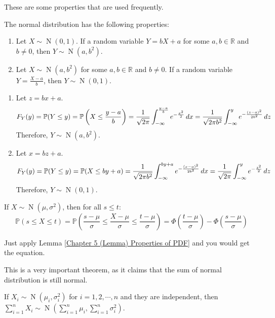 \documentclass{huhtakm-template-book}
\newcommand{\prob}{\mathbb{P}}
\DeclareMathOperator{\N}{N}
\begin{document}
These are some properties that are used frequently.
\begin{lem}
	\label{Chapter 5 (Lemma) Properties of Normal distribution}
	The normal distribution has the following properties:
	\begin{enumerate}
		\item Let $X\sim\N(0,1)$. If a random variable $Y=bX+a$ for some $a,b\in\mathbb{R}$ and $b\neq 0$, then $Y\sim\N(a,b^{2})$.
		\item Let $X\sim\N(a,b^{2})$ for some $a,b\in\mathbb{R}$ and $b\neq 0$. If a random variable $Y=\frac{X-a}{b}$, then $Y\sim\N(0,1)$.
	\end{enumerate}
\end{lem}
\begin{proofing}
	\begin{enumerate}
		\item Let $z=bx+a$.
		\begin{equation*}
			F_{Y}(y)=\prob(Y\leq y)=\prob\left(X\leq\frac{y-a}{b}\right)=\frac{1}{\sqrt{2\pi}}\intlu{-\infty}{\frac{y-a}{b}}e^{-\frac{x^{2}}{2}}\,dx=\frac{1}{\sqrt{2\pi b^{2}}}\intlu{-\infty}{y}e^{-\frac{(z-a)^{2}}{2b^{2}}}\,dz
		\end{equation*}
		Therefore, $Y\sim\N(a,b^{2})$.
		\item Let $x=bz+a$.
		\begin{equation*}
			F_{Y}(y)=\prob(Y\leq y)=\prob(X\leq by+a)=\frac{1}{\sqrt{2\pi b^{2}}}\intlu{-\infty}{by+a}e^{-\frac{(x-a)^{2}}{2b^{2}}}\,dx=\frac{1}{\sqrt{2\pi}}\intlu{-\infty}{y}e^{-\frac{z^{2}}{2}}\,dz
		\end{equation*}
		Therefore, $Y\sim\N(0,1)$.
	\end{enumerate}
\end{proofing}
\begin{lem}
	If $X\sim\N(\mu,\sigma^{2})$, then for all $s\leq t$:
	\begin{equation*}
		\prob(s\leq X\leq t)=\prob\left(\frac{s-\mu}{\sigma}\leq\frac{X-\mu}{\sigma}\leq\frac{t-\mu}{\sigma}\right)=\Phi\left(\frac{t-\mu}{\sigma}\right)-\Phi\left(\frac{s-\mu}{\sigma}\right)
	\end{equation*}
\end{lem}
\begin{proofing}
	Just apply Lemma \ref{Chapter 5 (Lemma) Properties of PDF} and you would get the equation.
\end{proofing}
This is a very important theorem, as it claims that the sum of normal distribution is still normal.
\begin{thm}
	\label{Chapter 5 (Theorem) Additivity of Normal Distribution}
	If $X_{i}\sim\N(\mu_{i},\sigma_{i}^{2})$ for $i=1,2,\cdots,n$ and they are independent, then $\sum_{i=1}^{n}X_{i}\sim\N\left(\sum_{i=1}^{n}\mu_{i},\sum_{i=1}^{n}\sigma_{i}^{2}\right)$.
\end{thm}
\end{document}

